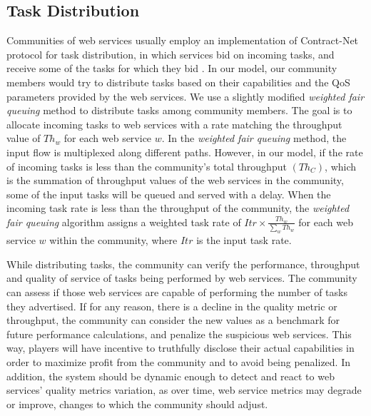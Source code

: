 \documentclass[11pt,onecolumn]{IEEEtran}
\begin{document}

\subsection{Task Distribution}

Communities of web services usually employ an implementation of Contract-Net protocol for task distribution, in which services bid on incoming tasks, and receive some of the tasks for which they bid \cite{DBLP:journals/ijebr/MaamarSTBB09,DBLP:conf/aina/ElnaffarMYBT08}. In our model, our community members would try to distribute tasks based on their capabilities and the QoS parameters provided by the web services. We use a slightly modified \emph{weighted fair queuing} method to distribute tasks among community members. The goal is to allocate incoming tasks to web services with a rate matching the throughput value of $Th_{w}$ for each web service $w$. In the \emph{weighted fair queuing} method, the input flow is multiplexed along different paths. However, in our model, if the rate of incoming tasks is less than the community's total throughput $(Th_{C})$, which is the summation of throughput values of the web services in the community, some of the input tasks will be queued and served with a delay. 
When the incoming task rate is less than the throughput of the community, the \emph{weighted fair queuing} algorithm assigns a weighted task rate of $Itr \times \frac{Th_{w}}{\sum_{w}{Th_{w}}}$ for each web service $w$ within the community, where $Itr$ is the input task rate.

While distributing tasks, the community can verify the performance, throughput and quality of service of tasks being performed by web services. The community can assess if those web services are capable of performing the number of tasks they advertised. If for any reason, there is a decline in the quality metric or throughput, the community can consider the new values as a benchmark for future performance calculations, and penalize the suspicious web services. This way, players will have incentive to truthfully disclose their actual capabilities in order to maximize profit from the community and to avoid being penalized. In addition, the system should be dynamic enough to detect and react to web services' quality metrics variation, as over time, web service metrics may degrade or improve, changes to which the community should adjust.
\end{document}
